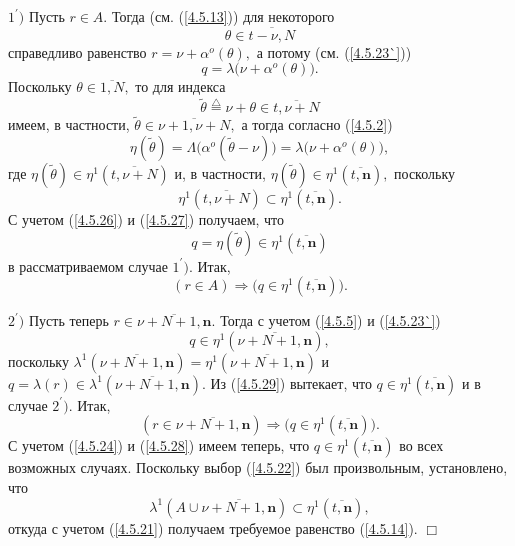 \documentclass[11pt,twoside,openany]{report}
\newcommand{\bfn}{\begin{equation}}
\newcommand{\efn}{\end{equation}}
\newcommand{\df}{\stackrel{\triangle}{=}}
\newcommand{\ov}{\overline}
\newcommand{\La}{\Lambda}
\newcommand{\la}{\lambda}
\newcommand{\al}{\alpha}
\begin{document}
{{$1^\prime)$  Пусть $r\in A.$ Тогда (см. (\ref{4.5.13})) для некоторого
\bfn\label{4.5.25}\theta\in \ov{t-\nu,N}
\efn
справедливо равенство $r = \nu + \al^o(\theta),$ а потому (см. (\ref{4.5.23`}))
\bfn\label{4.5.26}q = \la\bigl(\nu + \al^o(\theta)\bigl).
\efn
Поскольку $\theta\in\ov{1,N},$ то для индекса
$$\widetilde{\theta} \df \nu +\theta \in \ov{t,\nu+N}
$$
имеем, в частности, $\widetilde{\theta}\in \ov{\nu+1,\nu +N},$ а тогда
согласно (\ref{4.5.2}) \bfn\label{4.5.27}\eta(\widetilde{\theta}) =
\La\bigl(\al^o(\widetilde{\theta}-\nu)\bigl) = \la\bigl(\nu+ \al^o(\theta)\bigl),
\efn
где $\eta(\widetilde{\theta}) \in \eta^1(\ov{t,\nu+N})$ и, в частности,
$\eta(\widetilde{\theta}) \in \eta^1(\ov{t,\mathbf{n}}),$ поскольку
$$\eta^1(\ov{t,\nu+N})\subset \eta^1(\ov{t,\mathbf{n}}).
$$
С учетом (\ref{4.5.26}) и (\ref{4.5.27}) получаем, что
$$q = \eta(\widetilde{\theta}) \in \eta^1(\ov{t,\mathbf{n}})
$$
в рассматриваемом случае $1^\prime).$  Итак,
\bfn\label{4.5.28}(r\in A) \Longrightarrow \bigl(q \in \eta^1(\ov{t,\mathbf{n}})\bigl).
\efn

$2^\prime)$  Пусть теперь $r\in \ov{\nu+N +1,\mathbf{n}}.$ Тогда с учетом
(\ref{4.5.5}) и (\ref{4.5.23`})
\bfn\label{4.5.29}q\in \eta^1(\ov{\nu+N+1,\mathbf{n}}),
\efn
поскольку $\la^1(\ov{\nu+N+1,\mathbf{n}})= \eta^1(\ov{\nu+N+1,\mathbf{n}})$ и
$q = \la(r)\in \la^1(\ov{\nu+N+1,\mathbf{n}}).$ Из (\ref{4.5.29}) вытекает, что
$q\in \eta^1(\ov{t,\mathbf{n}})$ и в случае $2^\prime).$  Итак,
$$(r\in \ov{\nu+N+1,\mathbf{n}})\Longrightarrow \bigl(q\in \eta^1(\ov{t,\mathbf{n}})\bigl).
$$
С учетом (\ref{4.5.24}) и (\ref{4.5.28}) имеем теперь, что
$q\in \eta^1(\ov{t,\mathbf{n}})$ во всех возможных случаях. Поскольку выбор
(\ref{4.5.22}) был произвольным, установлено, что
$$\la^1(A \cup \ov{\nu+N+1,\mathbf{n}})\subset \eta^1(\ov{t,\mathbf{n}}),
$$
откуда с учетом (\ref{4.5.21}) получаем требуемое равенство (\ref{4.5.14}). \hfill $\Box$

}}
\end{document}
